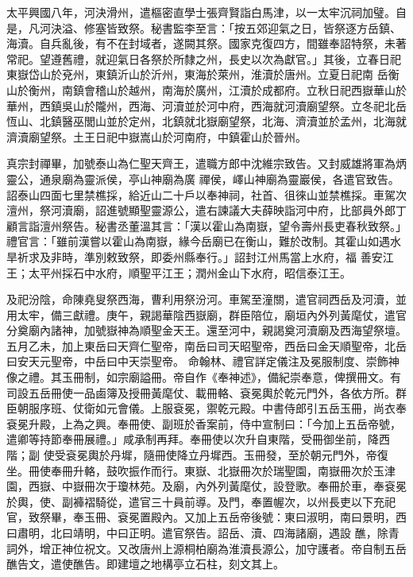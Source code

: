 \begin{pinyinscope}
 太平興國八年，河決滑州，遣樞密直學士張齊賢詣白馬津，以一太牢沉祠加璧。自是，凡河決溢、修塞皆致祭。秘書監李至言：「按五郊迎氣之日，皆祭逐方岳鎮、海瀆。自兵亂後，有不在封域者，遂闕其祭。國家克復四方，間雖奉詔特祭，未著常祀。望遵舊禮，就迎氣日各祭於所隸之州，長史以次為獻官。」其後，立春日祀東嶽岱山於兗州，東鎮沂山於沂州，東海於萊州，淮瀆於唐州。立夏日祀南
 岳衡山於衡州，南鎮會稽山於越州，南海於廣州，江瀆於成都府。立秋日祀西嶽華山於華州，西鎮吳山於隴州，西海、河瀆並於河中府，西海就河瀆廟望祭。立冬祀北岳恆山、北鎮醫巫閭山並於定州，北鎮就北嶽廟望祭，北海、濟瀆並於孟州，北海就濟瀆廟望祭。土王日祀中嶽嵩山於河南府，中鎮霍山於晉州。



 真宗封禪畢，加號泰山為仁聖天齊王，遣職方郎中沈維宗致告。又封威雄將軍為炳靈公，通泉廟為靈派侯，亭山神廟為廣
 禪侯，嶧山神廟為靈巖侯，各遣官致告。詔泰山四面七里禁樵採，給近山二十戶以奉神祠，社首、徂徠山並禁樵採。車駕次澶州，祭河瀆廟，詔進號顯聖靈源公，遣右諫議大夫薛映詣河中府，比部員外郎丁顧言詣澶州祭告。秘書丞董溫其言：「漢以霍山為南嶽，望令壽州長吏春秋致祭。」禮官言：「雖前漢嘗以霍山為南嶽，緣今岳廟已在衡山，難於改制。其霍山如遇水旱祈求及非時，準別敕致祭，即委州縣奉行。」詔封江州馬當上水府，福
 善安江王；太平州採石中水府，順聖平江王；潤州金山下水府，昭信泰江王。



 及祀汾陰，命陳堯叟祭西海，曹利用祭汾河。車駕至潼關，遣官祠西岳及河瀆，並用太牢，備三獻禮。庚午，親謁華陰西嶽廟，群臣陪位，廟垣內外列黃麾仗，遣官分奠廟內諸神，加號嶽神為順聖金天王。還至河中，親謁奠河瀆廟及西海望祭壇。五月乙未，加上東岳曰天齊仁聖帝，南岳曰司天昭聖帝，西岳曰金天順聖帝，北岳曰安天元聖帝，中岳曰中天崇聖帝。
 命翰林、禮官詳定儀注及冕服制度、崇飾神像之禮。其玉冊制，如宗廟謚冊。帝自作《奉神述》，備紀崇奉意，俾撰冊文。有司設五岳冊使一品鹵簿及授冊黃麾仗、載冊輅、袞冕輿於乾元門外，各依方所。群臣朝服序班、仗衛如元會儀。上服袞冕，禦乾元殿。中書侍郎引五岳玉冊，尚衣奉袞冕升殿，上為之興。奉冊使、副班於香案前，侍中宣制曰：「今加上五岳帝號，遣卿等持節奉冊展禮。」咸承制再拜。奉冊使以次升自東階，受冊御坐前，降西階；副
 使受袞冕輿於丹墀，隨冊使降立丹墀西。玉冊發，至於朝元門外，帝復坐。冊使奉冊升輅，鼓吹振作而行。東嶽、北嶽冊次於瑞聖園，南嶽冊次於玉津園，西嶽、中嶽冊次于瓊林苑。及廟，內外列黃麾仗，設登歌。奉冊於車，奉袞冕於輿，使、副褲褶騎從，遣官三十員前導。及門，奉置幄次，以州長吏以下充祀官，致祭畢，奉玉冊、袞冕置殿內。又加上五岳帝後號：東曰淑明，南曰景明，西曰肅明，北曰靖明，中曰正明。遣官祭告。詔岳、瀆、四海諸廟，遇設
 醮，除青詞外，增正神位祝文。又改唐州上源桐柏廟為淮瀆長源公，加守護者。帝自制五岳醮告文，遣使醮告。即建壇之地構亭立石柱，刻文其上。




\end{pinyinscope}
